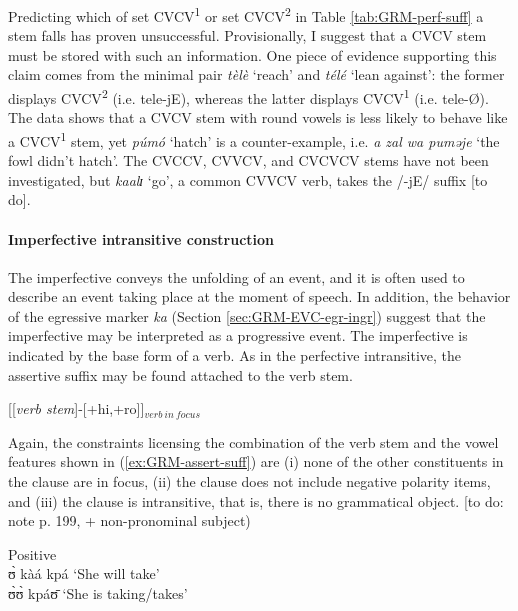 \begin{exe}
\begin{exe}
\begin{exe}
{\begin{exe}
\begin{exe}
\begin{exe}
\begin{exe}
\begin{exe}
\begin{exe}
\begin{exe}
\begin{xlist}
\begin{exe}
\begin{exe}
\begin{exe}
\begin{exe}
\begin{exe}
\begin{exe}
\begin{exe}
\begin{exe}
\begin{exe}
\begin{exe}
\begin{exe}
\begin{exe}
\begin{exe}
Predicting  which of 
set CVCV\textsuperscript{1} or set CVCV\textsuperscript{2} in Table 
\ref{tab:GRM-perf-suff}  a
stem falls  has proven unsuccessful. Provisionally,  I suggest that a CVCV
stem must be stored with such an information. One piece of evidence
supporting this claim comes from
the minimal pair {\it tèlè} `reach' and  {\it télé} `lean against':  the
former displays CVCV\textsuperscript{2} (i.e. tele-jE),  whereas the latter 
displays CVCV\textsuperscript{1}
(i.e. tele-\O).  The data shows that a  CVCV stem with round vowels is less 
likely to
behave like a CVCV\textsuperscript{1} stem, yet {\it púmó} `hatch' is a 
counter-example, i.e.
{\it a zal wa puməje} `the fowl didn't hatch'. The CVCCV, CVVCV, and CVCVCV 
stems
have  not been investigated, but {\it kaalɪ} `go', a common  CVVCV verb, takes
the
/-jE/ suffix [to do].  


\paragraph{Imperfective intransitive construction}
\label{sec:GRM-verb-perf-intran}

The imperfective  conveys the unfolding of an event, and it is often used to
describe an event taking place at the moment of speech. In addition, the
behavior of the egressive marker {\it ka} (Section \ref{sec:GRM-EVC-egr-ingr})
suggest that the imperfective may be interpreted as a progressive event.  The 
imperfective is indicated by the base
form of a verb. As in the perfective intransitive, the assertive suffix may be
found attached to the verb stem. 


\ea\label{ex:GRM-assert-suff}
[[{\it verb stem}]-[{\sc +hi,+ro}]]$_{verb \ in \ focus}$
\z

Again, the constraints licensing the combination of the verb stem and the vowel
features  shown in (\ref{ex:GRM-assert-suff})   are (i) none of the other
constituents in the clause are in focus, (ii) the clause does not include
negative polarity items, and (iii) the clause is intransitive, that is, there is
no grammatical object. [to do: note p. 199, + non-pronominal subject)




\ea\label{ex:GRM-pos-neg-take}
\ea\label{ex:GRM-ipfv-out-pos}{\rm Positive}\\
 ʊ̀ kàá kpá  {\rm `She will take'}\\
   ʊ̀ʊ̀ kpáʊ̄    {\rm `She  is taking/takes'}


\end{exe}
\end{exe}
\end{exe}
\end{exe}
\end{exe}
\end{exe}
\end{exe}
\end{exe}
\end{exe}
\end{exe}
\end{exe}
\end{exe}
\end{exe}
\end{xlist}
\end{exe}
\end{exe}
\end{exe}
\end{exe}
\end{exe}
\end{exe}
\end{exe}}
\end{exe}
\end{exe}
\end{exe}
